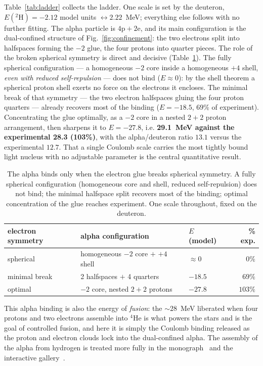 \documentclass[11pt]{article}
\begin{document}
Table~\ref{tab:ladder} collects the ladder. One scale is set by the deuteron,
$E(^2\mathrm{H})=-2.12$ model units $\leftrightarrow 2.22$~MeV; everything else follows with no
further fitting. The alpha particle is $\mathrm{4p}+\mathrm{2e}$, and its main configuration is
the dual-confined structure of Fig.~\ref{fig:confinement}: the two electrons split into halfspaces
forming the $-2$ glue, the four protons into quarter pieces. The role of the broken spherical
symmetry is direct and decisive (Table~\ref{tab:symmetry}). The fully spherical configuration ---
a homogeneous $-2$ core inside a homogeneous $+4$ shell, \emph{even with reduced self-repulsion}
--- does not bind ($E\approx 0$): by the shell theorem a spherical proton shell exerts no force on
the electrons it encloses. The minimal break of that symmetry --- the two electron halfspaces
gluing the four proton quarters --- already recovers most of the binding ($E=-18.5$, $69\%$ of
experiment). Concentrating the glue optimally, as a $-2$ core in a nested $2{+}2$ proton
arrangement, then sharpens it to $E=-27.8$, i.e. \textbf{29.1~MeV against the experimental 28.3
(103\%)}, with the alpha/deuteron ratio $13.1$ versus the experimental $12.7$. That a single
Coulomb scale carries the most tightly bound light nucleus with no adjustable parameter is the
central quantitative result.

\begin{table}[t]
\centering
\begin{tabular}{lllr}
\toprule
electron symmetry & alpha configuration & $E$ (model) & \% exp.\\
\midrule
spherical & homogeneous $-2$ core $+$ $+4$ shell & $\approx 0$ & $0\%$\\
minimal break & 2 halfspaces $+$ 4 quarters & $-18.5$ & $69\%$\\
optimal & $-2$ core, nested $2{+}2$ protons & $-27.8$ & $103\%$\\
\bottomrule
\end{tabular}
\caption{The alpha binds only when the electron glue breaks spherical symmetry. A fully spherical
configuration (homogeneous core and shell, reduced self-repulsion) does not bind; the minimal
halfspace split recovers most of the binding; optimal concentration of the glue reaches
experiment. One scale throughout, fixed on the deuteron.}
\label{tab:symmetry}
\end{table}

This alpha binding is also the energy of \emph{fusion}: the ${\sim}28$~MeV liberated when four
protons and two electrons assemble into $^4$He is what powers the stars and is the goal of
controlled fusion, and here it is simply the Coulomb binding released as the proton and electron
clouds lock into the dual-confined alpha. The assembly of the alpha from hydrogen is treated more
fully in the monograph~\cite{Johnson-Book} and the interactive gallery~\cite{Gallery}.
\end{document}
